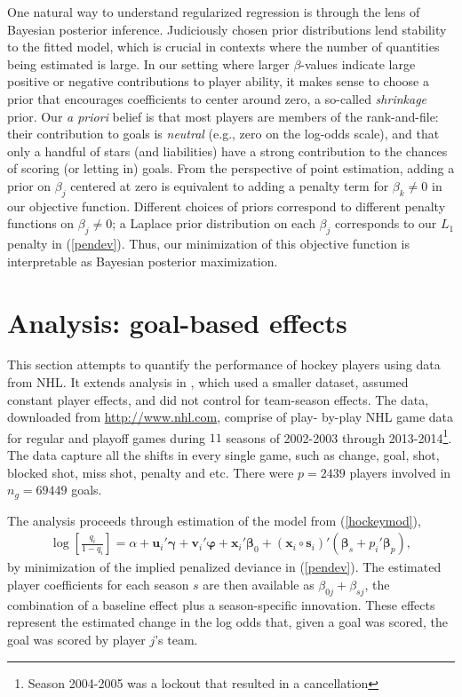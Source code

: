 One natural way to understand regularized regression is through the lens of
Bayesian posterior inference. Judiciously chosen prior distributions lend
stability to the fitted model, which is crucial in contexts where the number
of quantities being estimated is large. In our setting where larger
$\beta$-values indicate large positive or negative contributions to player
ability, it makes sense to choose a prior that encourages coefficients to
center around zero, a so-called {\em shrinkage} prior.  Our {\em a priori}
belief is that most players are members of the rank-and-file: their
contribution to goals is {\em neutral} (e.g., zero on the log-odds scale), and
that only a handful of stars (and liabilities) have a strong contribution to
the chances of scoring (or letting in) goals.  From the perspective of point
estimation, adding a prior on $\beta_j$ centered at zero is equivalent to
adding a penalty term for $\beta_k \ne 0$ in our objective function. Different
choices of priors correspond to different penalty functions on $\beta_j \ne
0$; a Laplace prior distribution on each $\beta_j$  corresponds to our $L_1$
penalty in (\ref{pendev}).  Thus, our minimization of this objective function
is interpretable as Bayesian posterior maximization.

\section{Analysis: goal-based effects}
\label{sec:goals}



This section attempts to quantify the performance of hockey players using data
from NHL. It extends  analysis in \cite{gramacy:jensen:taddy:2013}, which used
a smaller dataset, assumed constant player effects, and did not control for team-season 
effects. The data, downloaded from \url{http://www.nhl.com}, comprise of play-
by-play NHL game data for regular and playoff games during $11$ seasons of
2002-2003 through 2013-2014\footnote{Season 2004-2005 was a lockout that
resulted in a cancellation}. The data capture all the shifts in every single
game, such as change, goal, shot, blocked shot, miss shot, penalty and etc.
There were $p=2439$ players involved in $n_g=69449$ goals.


The analysis proceeds through estimation of the model from (\ref{hockeymod}),
\begin{align*}
\log\left[\frac{q_{i}}{1-q_{i}}\right] = \alpha + \mathbf{u}_i'\boldsymbol{\gamma} +
\mathbf{v}_i'\boldsymbol{\varphi} + \mathbf{x}_i'\boldsymbol{\beta}_0 +
(\mathbf{x}_i\circ\mathbf{s}_i)'(\boldsymbol{\beta}_s +
p_i'\boldsymbol{\beta}_{p}), \end{align*} by minimization of the implied
penalized deviance in (\ref{pendev}). The estimated player coefficients for
each season $s$ are then available as $\beta_{0j} + \beta_{sj}$,  the
combination of a  baseline effect plus a season-specific innovation.  These
effects represent the estimated change in the log odds that, given a goal was
scored, the goal was scored by player $j$'s team.


